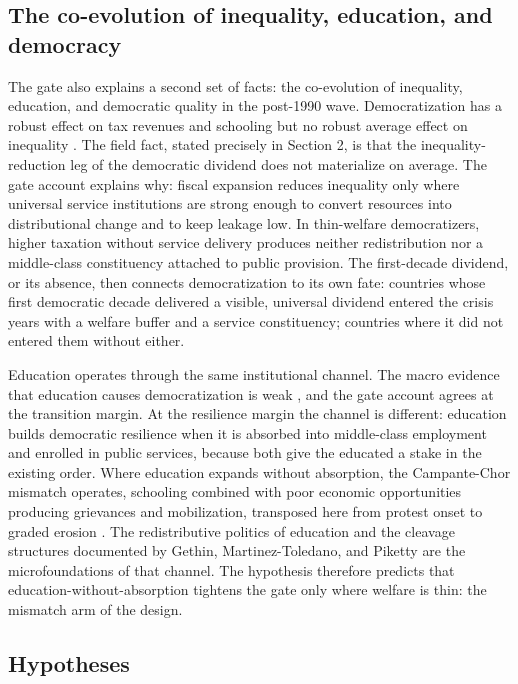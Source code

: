 \subsection{The co-evolution of inequality, education, and democracy}

The gate also explains a second set of facts: the co-evolution of inequality, education, and democratic quality in the post-1990 wave. Democratization has a robust effect on tax revenues and schooling but no robust average effect on inequality \citep{AcemogluNaidu2015}. The field fact, stated precisely in Section 2, is that the inequality-reduction leg of the democratic dividend does not materialize on average. The gate account explains why: fiscal expansion reduces inequality only where universal service institutions are strong enough to convert resources into distributional change and to keep leakage low. In thin-welfare democratizers, higher taxation without service delivery produces neither redistribution nor a middle-class constituency attached to public provision. The first-decade dividend, or its absence, then connects democratization to its own fate: countries whose first democratic decade delivered a visible, universal dividend entered the crisis years with a welfare buffer and a service constituency; countries where it did not entered them without either.

Education operates through the same institutional channel. The macro evidence that education causes democratization is weak \citep{AcemogluJohnson2005}, and the gate account agrees at the transition margin. At the resilience margin the channel is different: education builds democratic resilience when it is absorbed into middle-class employment and enrolled in public services, because both give the educated a stake in the existing order. Where education expands without absorption, the Campante-Chor mismatch operates, schooling combined with poor economic opportunities producing grievances and mobilization, transposed here from protest onset to graded erosion \citep{CampanteChor2012}. The redistributive politics of education \citep{Ansell2010} and the cleavage structures documented by Gethin, Martinez-Toledano, and Piketty \citep{Gethin2022} are the microfoundations of that channel. The hypothesis therefore predicts that education-without-absorption tightens the gate only where welfare is thin: the mismatch arm of the design.

\subsection{Hypotheses}

